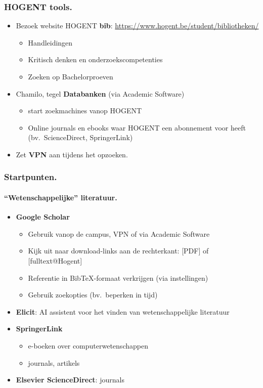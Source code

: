 \documentclass[aspectratio=169]{beamer}
\begin{document}
\begin{frame}
  \frametitle{HOGENT tools.}

  \begin{itemize}
    \item<+-> Bezoek website HOGENT \textbf{bib}: \url{https://www.hogent.be/student/bibliotheken/}
      \begin{itemize}
        \item Handleidingen
        \item Kritisch denken en onderzoekscompetenties
        \item Zoeken op Bachelorproeven
      \end{itemize}
    \item<+-> Chamilo, tegel \textbf{Databanken} (via Academic Software)
      \begin{itemize}
        \item start zoekmachines vanop HOGENT
        \item Online journals en ebooks waar HOGENT een abonnement voor heeft (bv.~ScienceDirect, SpringerLink)
      \end{itemize}
    \item<+-> Zet \textbf{VPN} aan tijdens het opzoeken.
  \end{itemize}
\end{frame}

\begin{frame}
  \frametitle{Startpunten.}
  \framesubtitle{``Wetenschappelijke'' literatuur.}

  \begin{itemize}
    \item<+-> \textbf{Google Scholar}
      \begin{itemize}
        \item Gebruik vanop de campus, VPN of via Academic Software
        \item Kijk uit naar download-links aan de rechterkant: [PDF] of [fulltext@Hogent]
        \item Referentie in Bib{\TeX}-formaat verkrijgen (via instellingen)
        \item Gebruik zoekopties (bv.~beperken in tijd)
      \end{itemize}
    \item<+-> \textbf{Elicit}: AI assistent voor het vinden van wetenschappelijke literatuur
    \item<+-> \textbf{SpringerLink}
      \begin{itemize}
        \item e-boeken over computerwetenschappen
        \item journals, artikels
      \end{itemize}
    \item<+-> \textbf{Elsevier ScienceDirect}: journals
  \end{itemize}
\end{frame}
\end{document}
